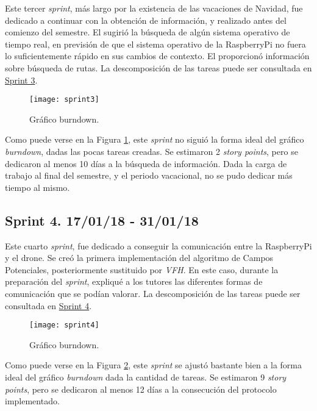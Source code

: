Este tercer \emph{sprint}, más largo por la existencia de las vacaciones de Navidad, fue dedicado a continuar con la obtención de información, y realizado antes del comienzo del semestre.
El \tutor{} sugirió la búsqueda de algún sistema operativo de tiempo real, en previsión de que el sistema operativo de la RaspberryPi no fuera lo suficientemente rápido en sus cambios de contexto.
El \cotutorTwo{} proporcionó información sobre búsqueda de rutas. 
La descomposición de las tareas puede ser consultada en \href{https://github.com/mbm0089/gii_0_17.02_snsi/milestone/3?closed=1}{Sprint 3}.

\begin{figure}[H]
	\centering
	\texttt{[image: sprint3]}
	\caption[Burndown Sprint 3]{Gráfico burndown.}\label{fig:sprint3}
\end{figure}

Como puede verse en la Figura \ref{fig:sprint3}, este \emph{sprint} no siguió la forma ideal del gráfico \emph{burndown}, dadas las pocas tareas creadas. 
Se estimaron 2 \emph{story points}, pero se dedicaron al menos 10 días a la búsqueda de información. Dada la carga de trabajo al final del semestre, y el periodo vacacional, no se pudo dedicar más tiempo al mismo.

\subsection{Sprint 4. 17/01/18 - 31/01/18}

Este cuarto \emph{sprint}, fue dedicado a conseguir la comunicación entre la RaspberryPi y el drone. Se creó la primera implementación del algoritmo de Campos Potenciales, posteriormente sustituido por \emph{VFH}.
En este caso, durante la preparación del \emph{sprint}, expliqué a los tutores las diferentes formas de comunicación que se podían valorar.
La descomposición de las tareas puede ser consultada en \href{https://github.com/mbm0089/gii_0_17.02_snsi/milestone/4?closed=1}{Sprint 4}.

\begin{figure}[H]
	\centering
	\texttt{[image: sprint4]}
	\caption[Burndown Sprint 4]{Gráfico burndown.}\label{fig:sprint4}
\end{figure}

Como puede verse en la Figura \ref{fig:sprint4}, este \emph{sprint} se ajustó bastante bien a la forma ideal del gráfico \emph{burndown} dada la cantidad de tareas.
Se estimaron 9 \emph{story points}, pero se dedicaron al menos 12 días a la consecución del protocolo implementado.

